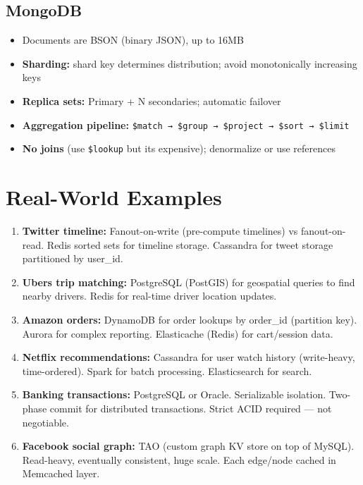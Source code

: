 \documentclass[11pt]{article}
\providecommand{\tightlist}{\setlength{\itemsep}{1pt}\setlength{\parskip}{0pt}}
\begin{document}
\subsection{MongoDB}\label{mongodb}

\begin{itemize}
\tightlist
\item
  Documents are BSON (binary JSON), up to 16MB
\item
  \textbf{Sharding:} shard key determines distribution; avoid monotonically increasing keys
\item
  \textbf{Replica sets:} Primary + N secondaries; automatic failover
\item
  \textbf{Aggregation pipeline:} \texttt{\$match\ →\ \$group\ →\ \$project\ →\ \$sort\ →\ \$limit}
\item
  \textbf{No joins} (use \texttt{\$lookup} but it\textquotesingle s expensive); denormalize or use references
\end{itemize}

\section{Real-World Examples}\label{real-world-examples}

\begin{enumerate}
\def\labelenumi{\arabic{enumi}.}
\item
  \textbf{Twitter timeline:} Fanout-on-write (pre-compute timelines) vs fanout-on-read. Redis sorted sets for timeline storage. Cassandra for tweet storage partitioned by user\_id.
\item
  \textbf{Uber\textquotesingle s trip matching:} PostgreSQL (PostGIS) for geospatial queries to find nearby drivers. Redis for real-time driver location updates.
\item
  \textbf{Amazon orders:} DynamoDB for order lookups by order\_id (partition key). Aurora for complex reporting. Elasticache (Redis) for cart/session data.
\item
  \textbf{Netflix recommendations:} Cassandra for user watch history (write-heavy, time-ordered). Spark for batch processing. Elasticsearch for search.
\item
  \textbf{Banking transactions:} PostgreSQL or Oracle. Serializable isolation. Two-phase commit for distributed transactions. Strict ACID required --- not negotiable.
\item
  \textbf{Facebook social graph:} TAO (custom graph KV store on top of MySQL). Read-heavy, eventually consistent, huge scale. Each edge/node cached in Memcached layer.
\end{enumerate}
\end{document}
